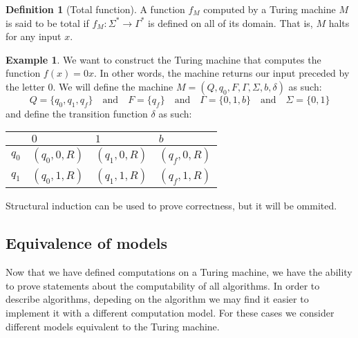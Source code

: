 \documentclass[11pt,a4paper]{article}
\theoremstyle{definition}
\newtheorem{definition}{Definition}[section]
\newtheorem{example}{Example}[section]
\theoremstyle{plain}
\newcommand{\tand}{\quad \text{and} \quad}
\begin{document}
  \begin{definition}[Total function]
    A function $f_M$ computed by a Turing machine $M$ is said to be
    total if $f_M \colon \Sigma^* \to \Gamma^*$ is defined on all of
    its domain. That is, $M$ halts for any input $x$.
  \end{definition}

  \begin{example}
    We want to construct the Turing machine that computes the function
    $f(x) = 0x$.
    In other words, the machine returns our input preceded by the letter $0$.
    We will define the machine $M = (Q,q_0,F,\Gamma,\Sigma,b,\delta)$ as
    such:
    \[
      Q = \{q_0,q_1,q_f\} \tand
      F = \{q_f\} \tand
      \Gamma = \{0,1,b\} \tand
      \Sigma = \{0,1\}
    \]
    and define the transition function $\delta$ as such:
    \begin{center}
      \begin{tabular}{|l|l|l|l|}
        \hline
              & $0$         & $1$         & $b$         \\ \hline
        $q_0$ & $(q_0,0,R)$ & $(q_1,0,R)$ & $(q_f,0,R)$ \\ \hline
        $q_1$ & $(q_0,1,R)$ & $(q_1,1,R)$ & $(q_f,1,R)$ \\ \hline
      \end{tabular}
    \end{center}
    Structural induction can be used to prove correctness, but it will
    be ommited.
  \end{example}

  \subsection{Equivalence of models}
  Now that we have defined computations on a Turing machine, we have the
  ability to prove statements about the computability of all algorithms.
  In order to describe algorithms, depeding on the algorithm we may find
  it easier to implement it with a different computation model.
  For these cases we consider different models equivalent to the Turing
  machine.
\end{document}
